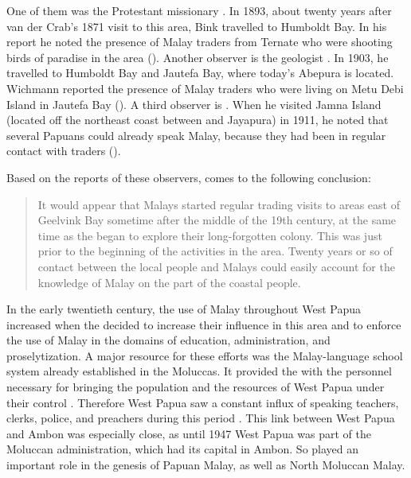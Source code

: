 {One of them was the Protestant missionary \citet{Bink.1894}. In 1893, about twenty years after van der Crab’s 1871 visit to this area, {Bink} travelled to Humboldt Bay. In his report he noted the presence of Malay traders from Ternate who were shooting birds of paradise in the area (\citeyear*[325]{Bink.1894}). Another observer is the  geologist \citet{Wichmann.1917}. In 1903, he travelled to Humboldt Bay and Jautefa Bay, where today’s Abepura is located. Wichmann reported the presence of Malay traders who were living on Metu Debi Island in Jautefa Bay (\citeyear*[150]{Wichmann.1917}). A third observer is \citet{vanHasselt.1926}. When he visited Jamna Island (located off the northeast coast between  and Jayapura) in 1911, he noted that several Papuans could already speak Malay, because they had been in regular contact with traders (\citeyear*[134]{vanHasselt.1926}).



Based on the reports of these observers, \citet[147]{Seiler.1982} comes to the following conclusion:

\begin{quote}
It would appear that Malays started regular trading visits to areas east of Geelvink Bay sometime after the middle of the 19th century, at the same time as the  began to explore their long-forgotten colony. This was just prior to the beginning of the  activities in the area. Twenty years or so of contact between the local people and Malays could easily account for the knowledge of Malay on the part of the coastal people.
\end{quote}


In the early twentieth century, the use of Malay throughout West Papua increased when the  decided to increase their influence in this area and to enforce the use of Malay in the domains of education, administration, and proselytization. A major resource for these efforts was the Malay-language school system already established in the Moluccas. It provided the  with the personnel necessary for bringing the population and the resources of West Papua under their control {\citep[64]{Collins.1998}}. Therefore West Papua saw a constant influx of  speaking teachers, clerks, police, and preachers during this period \citep[254–255]{Donohue.2007d}. This link between West Papua and Ambon was especially close, as until 1947 West Papua was part of the Moluccan administration, which had its capital in Ambon. So  played an important role in the genesis of Papuan Malay, as well as North Moluccan Malay.



}
